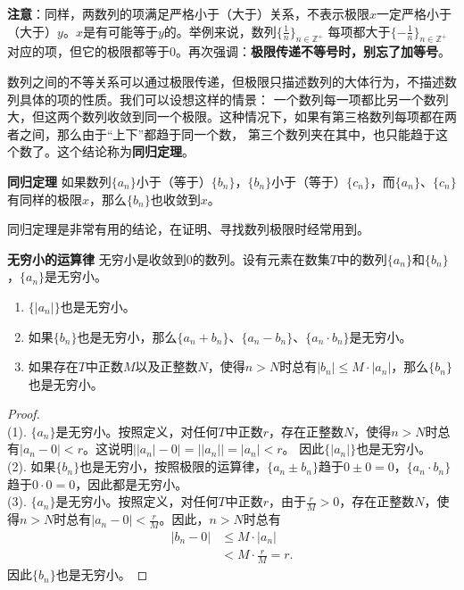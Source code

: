 \documentclass[12pt,UTF8,fontset=none]{ctexbook}
\begin{document}
\begin{appendix}
\textbf{注意}：同样，两数列的项满足严格小于（大于）关系，不表示极限$x$一定严格小于（大于）$y$。$x$是有可能等于$y$的。举例来说，数列$\{\frac{1}{n}\}_{n\in\mathbb{Z}^+}$
每项都大于$\{-\frac{1}{n}\}_{n\in\mathbb{Z}^+}$对应的项，但它的极限都等于$0$。再次强调：\textbf{极限传递不等号时，别忘了加等号}。

数列之间的不等关系可以通过极限传递，但极限只描述数列的大体行为，不描述数列具体的项的性质。我们可以设想这样的情景：
一个数列每一项都比另一个数列大，但这两个数列收敛到同一个极限。这种情况下，如果有第三格数列每项都在两者之间，那么由于“上下”都趋于同一个数，
第三个数列夹在其中，也只能趋于这个数了。这个结论称为\textbf{同归定理}。
\begin{tm}{\textbf{同归定理}}\label{tm:a-0-48}
    如果数列$\{a_n\}$小于（等于）$\{b_n\}$，$\{b_n\}$小于（等于）$\{c_n\}$，而$\{a_n\}$、$\{c_n\}$有同样的极限$x$，那么$\{b_n\}$也收敛到$x$。
\end{tm}

同归定理是非常有用的结论，在证明、寻找数列极限时经常用到。

\begin{tm}{\textbf{无穷小的运算律}}\label{tm:a-0-50}
    无穷小是收敛到$0$的数列。设有元素在数集$T$中的数列$\{a_n\}$和$\{b_n\}$，$\{a_n\}$是无穷小。
    \begin{enumerate}
        \item $\{|a_n|\}$也是无穷小。
        \item 如果$\{b_n\}$也是无穷小，那么$\{a_n + b_n\}$、$\{a_n - b_n\}$、$\{a_n\cdot b_n\}$是无穷小。
        \item 如果存在$T$中正数$M$以及正整数$N$，使得$n>N$时总有$|b_n| \leqslant M\cdot |a_n|$，那么$\{b_n\}$也是无穷小。
    \end{enumerate}
\end{tm}
\begin{proof}
    \mbox{} \\
    (1). $\{a_n\}$是无穷小。按照定义，对任何$T$中正数$r$，存在正整数$N$，使得$n>N$时总有$|a_n - 0| < r$。这说明$\big||a_n| - 0\big| = \big||a_n|\big| = |a_n| < r$。
    因此$\{|a_n|\}$也是无穷小。\\
    (2). 如果$\{b_n\}$也是无穷小，按照极限的运算律，$\{a_n \pm b_n\}$趋于$0 \pm 0 = 0$，$\{a_n \cdot b_n\}$趋于$0 \cdot 0 = 0$，因此都是无穷小。\\
    (3). $\{a_n\}$是无穷小。按照定义，对任何$T$中正数$r$，由于$\frac{r}{M} > 0$，存在正整数$N$，使得$n>N$时总有$|a_n - 0| < \frac{r}{M}$。因此，$n>N$时总有
    \begin{align*}
        |b_n - 0| &\leqslant M\cdot |a_n|  \\ 
        &< M\cdot \frac{r}{M} = r.  
    \end{align*}
    因此$\{b_n\}$也是无穷小。
\end{proof}


\end{appendix}
\end{document}
